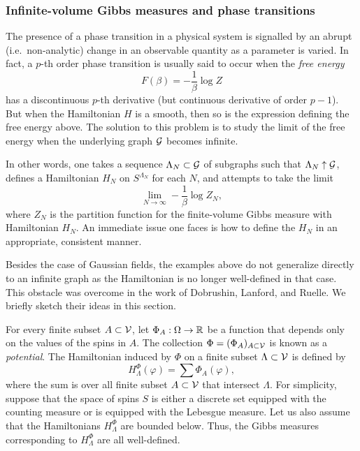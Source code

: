 
\subsubsection{Infinite-volume Gibbs measures and phase transitions}


The presence of a phase transition in a physical system is signalled by an abrupt
(i.e.\ non-analytic) change in an observable quantity as a parameter is varied. In fact,
a $p$-th order phase transition is usually said to occur when the \emph{free energy}
\begin{equation}
F(\beta) = -\frac{1}{\beta} \log Z
\end{equation}
has a discontinuous $p$-th derivative (but continuous derivative of order $p - 1$).
But when the Hamiltonian $H$ is a smooth, then so is the expression defining the free
energy above. The solution to this problem is to study the limit of the free energy
when the underlying graph $\mathcal{G}$ becomes infinite.

In other words, one takes a sequence $\Lambda_N \subset \mathcal{G}$ of subgraphs such that
$\Lambda_N \uparrow \mathcal{G}$, defines a Hamiltonian $H_N$ on $S^{\Lambda_N}$ for each $N$,
and attempts to take the limit
\begin{equation}
\lim_{N\to\infty} -\frac{1}{\beta} \log Z_N,
\end{equation}
where $Z_N$ is the partition function for the finite-volume Gibbs measure with Hamiltonian
$H_N$. An immediate issue one faces is how to define the $H_N$ in an appropriate, consistent
manner.

Besides the case of Gaussian fields, the examples above do not generalize directly to an infinite
graph as the Hamiltonian is no longer well-defined in that case. This obstacle was overcome in the
work of Dobrushin, Lanford, and Ruelle. We briefly sketch their ideas in this section.

For every finite subset $A \subset \mathcal{V}$, let $\Phi_A : \Omega \rightarrow {\mathbb R}$ be a function that
depends only on the values of the spins in $A$. The collection $\Phi = (\Phi_A)_{A\subset\mathcal{V}}$
is known as a \emph{potential}. The Hamiltonian induced by $\Phi$ on a finite
subset $\Lambda \subset \mathcal{V}$ is defined by
\begin{equation}
H^\Phi_\Lambda(\varphi) = \sum \Phi_A(\varphi),
\end{equation}
where the sum is over all finite subset $A \subset \mathcal{V}$ that intersect $\Lambda$.
For simplicity, suppose that the space of spins $S$ is either a discrete set equipped with the
counting measure or is equipped with the Lebesgue measure. Let us also assume that the Hamiltonians
$H^\Phi_\Lambda$ are bounded below. Thus, the  Gibbs measures corresponding to $H^\Phi_\Lambda$ are
all well-defined.

